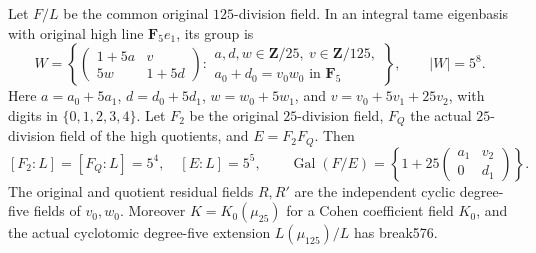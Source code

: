 \begin{lemma}
\label{lem:B-RD94-group}
Let $F/L$ be the common original $125$-division field. In an integral
tame eigenbasis with original high line $\mathbf F_5e_1$, its group is
\[
 W=\left\{\begin{pmatrix}1+5a&v\\5w&1+5d\end{pmatrix}:
 \begin{array}{l}a,d,w\in\mathbf Z/25,\ v\in\mathbf Z/125,\\
 a_0+d_0=v_0w_0\text{ in }\mathbf F_5\end{array}\right\},
 \qquad |W|=5^8.                                    \tag{B-RD94.2}
\]
Here $a=a_0+5a_1$, $d=d_0+5d_1$, $w=w_0+5w_1$, and
$v=v_0+5v_1+25v_2$, with digits in $\{0,1,2,3,4\}$.
Let $F_2$ be the original $25$-division field, $F_Q$ the actual
$25$-division field of the high quotients, and $E=F_2F_Q$.
Then
\[
 [F_2:L]=[F_Q:L]=5^4,\quad [E:L]=5^5,\qquad
 \operatorname{Gal}(F/E)=
 \left\{1+25\begin{pmatrix}a_1&v_2\\0&d_1\end{pmatrix}\right\}.
                                                        \tag{B-RD94.3}
\]
The original and quotient residual fields $R,R'$ are the independent
cyclic degree-five fields of $v_0,w_0$. Moreover
$K=K_0(\mu _{25})$ for a Cohen coefficient field $K_0$, and the
actual cyclotomic degree-five extension $L(\mu _{125})/L$ has break576.
\end{lemma}
